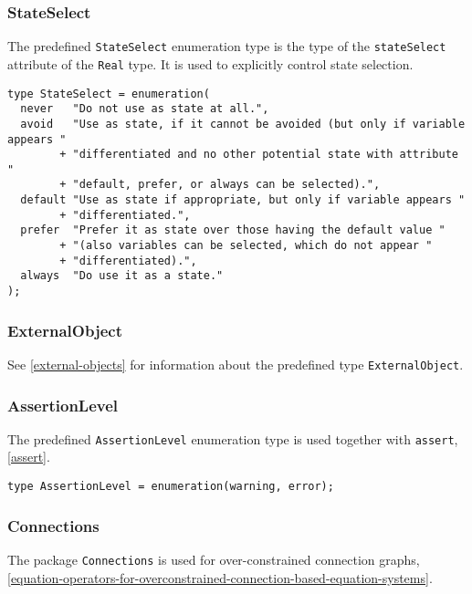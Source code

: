 \subsubsection{StateSelect}\label{stateselect}

The predefined \lstinline!StateSelect! enumeration type is the type of the \lstinline!stateSelect! attribute of the \lstinline!Real! type.  It is used to explicitly control state selection.

\begin{lstlisting}[language=modelica]
type StateSelect = enumeration(
  never   "Do not use as state at all.",
  avoid   "Use as state, if it cannot be avoided (but only if variable appears "
        + "differentiated and no other potential state with attribute "
        + "default, prefer, or always can be selected).",
  default "Use as state if appropriate, but only if variable appears "
        + "differentiated.",
  prefer  "Prefer it as state over those having the default value "
        + "(also variables can be selected, which do not appear "
        + "differentiated).",
  always  "Do use it as a state."
);
\end{lstlisting}

\subsubsection{ExternalObject}\label{externalobject}

See \cref{external-objects} for information about the predefined type \lstinline!ExternalObject!.

\subsubsection{AssertionLevel}\label{assertionlevel}

The predefined \lstinline!AssertionLevel! enumeration type is used together with \lstinline!assert!, \cref{assert}.
\begin{lstlisting}[language=modelica]
type AssertionLevel = enumeration(warning, error);
\end{lstlisting}

\subsubsection{Connections}\label{connections}

The package \lstinline!Connections! is used for over-constrained connection graphs, \cref{equation-operators-for-overconstrained-connection-based-equation-systems}.

